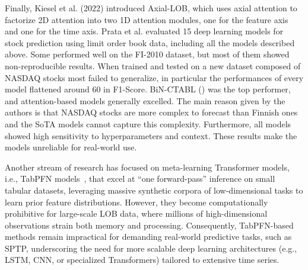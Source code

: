 Finally, Kiesel et al.\cite{kisiel2022axial} (2022) introduced Axial-LOB, which uses axial attention \cite{ho2019axial} to factorize 2D attention into two 1D attention modules, one for the feature axis and one for the time axis. 
Prata et al. \cite{prata2024lob} evaluated 15 deep learning models for stock prediction using limit order book data, including all the models described above. Some performed well on the FI-2010 dataset, but most of them showed non-reproducible results. When trained and tested on a new dataset composed of NASDAQ stocks most failed to generalize, in particular the performances of every model flattened around 60 in F1-Score. BiN-CTABL (\cite{tran2021data}) was the top performer, and attention-based models generally excelled. The main reason given by the authors is that NASDAQ stocks are more complex to forecast than Finnish ones and the SoTA models cannot capture this complexity. Furthermore, all models showed high sensitivity to hyperparameters and context. These results make the models unreliable for real-world use.

Another stream of research has focused on meta-learning Transformer models, i.e., TabPFN models~\cite{hollmann2022tabpfn, hoo2025tabular}, that excel at ``one forward-pass'' inference on small tabular datasets, leveraging massive synthetic corpora of low-dimensional tasks to learn prior feature distributions. 
However, they become computationally prohibitive for large-scale LOB data, where millions of high-dimensional observations strain both memory and processing. 
Consequently, TabPFN-based methods remain impractical for demanding real-world predictive tasks, such as SPTP, underscoring the need for more scalable deep learning architectures (e.g., LSTM, CNN, or specialized Transformers) tailored to extensive time series. 

